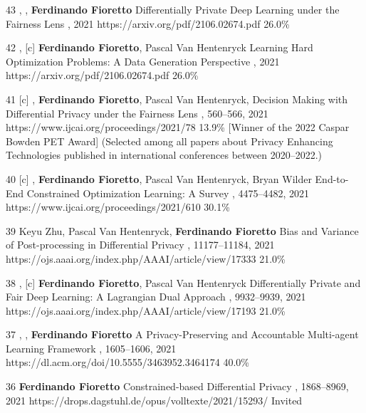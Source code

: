 \begin{pubs}
\confentry 
	{43} %
	{, , {\bf Ferdinando Fioretto}}
	{Differentially Private Deep Learning under the Fairness Lens}
	{\procNeurIPS, 2021}
	{https://arxiv.org/pdf/2106.02674.pdf}
	{26.0\%} %

\confentry 
	{42} %
	{, [c] {\bf Ferdinando Fioretto}, Pascal Van Hentenryck}
	{Learning Hard Optimization Problems: A Data Generation Perspective}
	{\procNeurIPS, 2021}
	{https://arxiv.org/pdf/2106.02674.pdf}
	{26.0\%} %

\confentryAwd 
	{41} %
	{[c] , {\bf Ferdinando Fioretto}, Pascal Van Hentenryck, }
	{Decision Making with Differential Privacy under the Fairness Lens}
	{\procIJCAI, 560--566, 2021}
	{https://www.ijcai.org/proceedings/2021/78}
	{13.9\%} %
	{[Winner of the 2022 Caspar Bowden PET Award]}
	{(Selected among all papers about Privacy Enhancing Technologies published in international conferences between 2020--2022.)}

\confentry 
	{40} %
	{[c] , {\bf Ferdinando Fioretto}, Pascal Van Hentenryck, Bryan Wilder}
	{End-to-End Constrained Optimization Learning: A Survey}
	{\procIJCAI, 4475--4482, 2021}
	{https://www.ijcai.org/proceedings/2021/610}
	{30.1\%}

\confentry 
	{39} %
	{Keyu Zhu, Pascal Van Hentenryck, {\bf Ferdinando Fioretto}}
	{Bias and Variance of Post-processing in Differential Privacy}
	{\procAAAI, 11177--11184, 2021}
	{https://ojs.aaai.org/index.php/AAAI/article/view/17333}
    {21.0\%} %

\confentry 
	{38} %
	{, [c] {\bf Ferdinando Fioretto}, Pascal Van Hentenryck}
	{Differentially Private and Fair Deep Learning: A Lagrangian Dual Approach}
	{\procAAAI, 9932--9939, 2021}
	{https://ojs.aaai.org/index.php/AAAI/article/view/17193}
    {21.0\%} %

\confentry
    {37} %
    {, , {\bf Ferdinando Fioretto}}
    {A Privacy-Preserving and Accountable Multi-agent Learning Framework}
    {\procAAMAS, 1605--1606, 2021}
    {https://dl.acm.org/doi/10.5555/3463952.3464174}
    {40.0\%}

\confentry
	{36} %
	{\bf Ferdinando Fioretto}
	{Constrained-based Differential Privacy}
	{\procCP, 1868--8969, 2021}
	{https://drops.dagstuhl.de/opus/volltexte/2021/15293/}
	{Invited}


\end{pubs}
